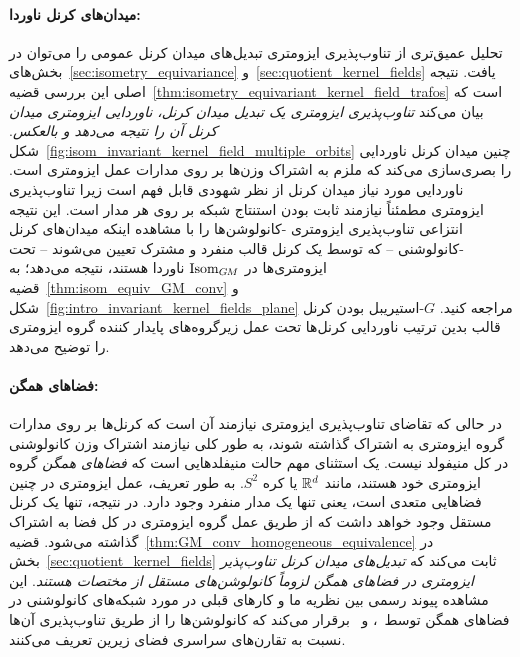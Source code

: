 \paragraph{میدان‌های کرنل ناوردا:}
تحلیل عمیق‌تری از تناوب‌پذیری ایزومتری تبدیل‌های میدان کرنل عمومی را می‌توان در بخش‌های~\ref{sec:isometry_equivariance} و~\ref{sec:quotient_kernel_fields} یافت.
نتیجه اصلی این بررسی قضیه~\ref{thm:isometry_equivariant_kernel_field_trafos} است که بیان می‌کند \emph{تناوب‌پذیری ایزومتری یک تبدیل میدان کرنل، ناوردایی ایزومتری میدان کرنل آن را نتیجه می‌دهد و بالعکس}.
شکل~\ref{fig:isom_invariant_kernel_field_multiple_orbits} چنین میدان کرنل ناوردایی را بصری‌سازی می‌کند که ملزم به اشتراک وزن‌ها بر روی مدارات عمل ایزومتری است.
ناوردایی مورد نیاز میدان کرنل از نظر شهودی قابل فهم است زیرا تناوب‌پذیری ایزومتری مطمئناً نیازمند ثابت بودن استنتاج شبکه بر روی هر مدار است.
این نتیجه انتزاعی تناوب‌پذیری ایزومتری \GM-کانولوشن‌ها را با مشاهده اینکه میدان‌های کرنل \GM-کانولوشنی -- که توسط یک کرنل قالب منفرد و مشترک تعیین می‌شوند -- تحت ایزومتری‌ها در $\operatorname{Isom}_{G\mkern-1.4muM}$ ناوردا هستند، نتیجه می‌دهد؛ به قضیه~\ref{thm:isom_equiv_GM_conv} و شکل~\ref{fig:intro_invariant_kernel_fields_plane} مراجعه کنید.
$G$-استیریبل بودن کرنل قالب بدین ترتیب ناوردایی کرنل‌ها تحت عمل زیرگروه‌های پایدار کننده گروه ایزومتری را توضیح می‌دهد.



\paragraph{فضاهای همگن:}
در حالی که تقاضای تناوب‌پذیری ایزومتری نیازمند آن است که کرنل‌ها بر روی مدارات گروه ایزومتری به اشتراک گذاشته شوند، به طور کلی نیازمند اشتراک وزن کانولوشنی در کل منیفولد نیست.
یک استثنای مهم حالت منیفلدهایی است که \emph{فضاهای همگن} گروه ایزومتری خود هستند، مانند $\mathbb{R}^d$ یا کره $S^2$.
به طور تعریف، عمل ایزومتری در چنین فضاهایی متعدی است، یعنی تنها یک مدار منفرد وجود دارد.
در نتیجه، تنها یک کرنل مستقل وجود خواهد داشت که از طریق عمل گروه ایزومتری در کل فضا به اشتراک گذاشته می‌شود.
قضیه~\ref{thm:GM_conv_homogeneous_equivalence} در بخش~\ref{sec:quotient_kernel_fields} ثابت می‌کند که \emph{تبدیل‌های میدان کرنل تناوب‌پذیر ایزومتری در فضاهای همگن لزوماً کانولوشن‌های مستقل از مختصات هستند}.
این مشاهده پیوند رسمی بین نظریه ما و کارهای قبلی در مورد شبکه‌های کانولوشنی در فضاهای همگن
توسط~\citet{Kondor2018-GENERAL}، \citet{Cohen2019-generaltheory} و~\citet{bekkers2020bspline} برقرار می‌کند
که کانولوشن‌ها را از طریق تناوب‌پذیری آن‌ها نسبت به تقارن‌های سراسری فضای زیرین تعریف می‌کنند.






